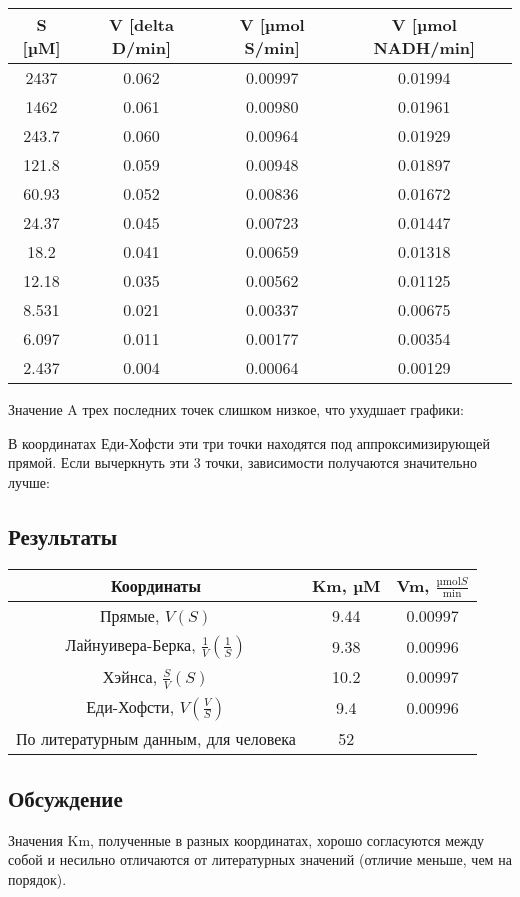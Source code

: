 \begin{tabular}{|c|c|c|c|}
\hline
S [µM] &
V [delta D/min] &
V [µmol S/min] &
V [µmol NADH/min] \\
\hline
2437  & 0.062 &  0.00997 & 0.01994 \\
1462  & 0.061 &  0.00980 & 0.01961 \\
243.7 & 0.060 &  0.00964 & 0.01929 \\
121.8 & 0.059 &  0.00948 & 0.01897 \\
60.93 & 0.052 &  0.00836 & 0.01672 \\
24.37 & 0.045 &  0.00723 & 0.01447 \\
18.2  & 0.041 &  0.00659 & 0.01318 \\
12.18 & 0.035 &  0.00562 & 0.01125 \\
8.531 & 0.021 &  0.00337 & 0.00675 \\
6.097 & 0.011 &  0.00177 & 0.00354 \\
2.437 & 0.004 &  0.00064 & 0.00129 \\
\hline
\end{tabular}

Значение A трех последних точек слишком низкое,
что ухудшает графики:





В координатах Еди-Хофсти эти три точки находятся под аппроксимизирующей прямой.
Если вычеркнуть эти 3 точки, зависимости получаются значительно лучше:









\subsection{Результаты}

\begin{tabular}{|c|c|c|}
\hline
Координаты & Km, µM & Vm, $\frac{\text{µmol} S}{\text{min}}$ \\
\hline
Прямые,           $V(S)$                       & 9.44 & 0.00997 \\
Лайнуивера-Берка, $\frac{1}{V}(\frac{1}{S})$   & 9.38 & 0.00996 \\
Хэйнса,           $\frac{S}{V}(S)$             & 10.2 & 0.00997 \\
Еди-Хофсти,       $V(\frac{V}{S})$             & 9.4  & 0.00996 \\
\hline
По литературным данным, для человека           & 52 & \\
\hline
\end{tabular}

\subsection{Обсуждение}
Значения Km, полученные в разных координатах, хорошо согласуются между собой
и несильно отличаются от литературных значений (отличие меньше, чем на порядок).

